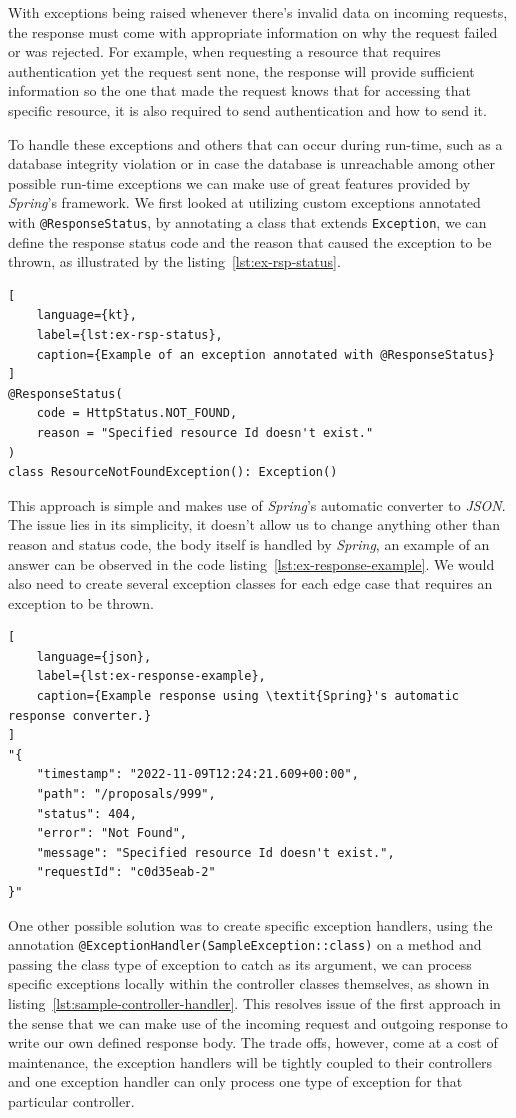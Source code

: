 With exceptions being raised whenever there's invalid data on incoming requests, the response must come with appropriate information on why the request failed or was rejected. For example, when requesting a resource that requires authentication yet the request sent none, the response will provide sufficient information so the one that made the request knows that for accessing that specific resource, it is also required to send authentication and how to send it.


To handle these exceptions and others that can occur during run-time, such as a database integrity violation or in case the database is unreachable among other possible run-time exceptions we can make use of great features provided by \textit{Spring}'s framework. We first looked at utilizing custom exceptions annotated with \lstinline{@ResponseStatus}, by annotating a class that extends \texttt{Exception}, we can define the response status code and the reason that caused the exception to be thrown, as illustrated by the listing~\ref{lst:ex-rsp-status}. 

\begin{lstlisting}[
    language={kt},
    label={lst:ex-rsp-status},
    caption={Example of an exception annotated with @ResponseStatus}
]
@ResponseStatus(
    code = HttpStatus.NOT_FOUND, 
    reason = "Specified resource Id doesn't exist."
)
class ResourceNotFoundException(): Exception()
\end{lstlisting}

This approach is simple and makes use of \textit{Spring}'s automatic converter to \textit{JSON}. The issue lies in its simplicity, it doesn't allow us to change anything other than reason and status code, the body itself is handled by \textit{Spring}, an example of an answer can be observed in the code listing~\ref{lst:ex-response-example}. 
We would also need to create several exception classes for each edge case that requires an exception to be thrown.

\begin{lstlisting}[
    language={json},
    label={lst:ex-response-example},
    caption={Example response using \textit{Spring}'s automatic response converter.}
]
"{
    "timestamp": "2022-11-09T12:24:21.609+00:00",
    "path": "/proposals/999",
    "status": 404,
    "error": "Not Found",
    "message": "Specified resource Id doesn't exist.",
    "requestId": "c0d35eab-2"
}"
\end{lstlisting}


One other possible solution was to create specific exception handlers, using the annotation \lstinline{@ExceptionHandler(SampleException::class)} on a method and passing the class type of exception to catch as its argument, we can process specific exceptions locally within the controller classes themselves, as shown in listing~\ref{lst:sample-controller-handler}. This resolves issue of the first approach in the sense that we can make use of the incoming request and outgoing response to write our own defined response body. 
The trade offs, however, come at a cost of maintenance, the exception handlers will be tightly coupled to their controllers and one exception handler can only process one type of exception for that particular controller.

